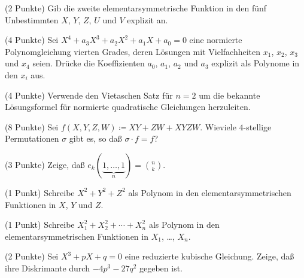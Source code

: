 \documentclass{algsheet}
\begin{document}
\begin{exercise}(2 Punkte)\newline
    Gib die zweite elementarsymmetrische Funktion in den fünf Unbestimmten
    \(X\), \(Y\), \(Z\), \(U\) und \(V\) explizit an.
\end{exercise}

\begin{exercise}(4 Punkte)\newline
    Sei \(X^4 + a_3 X^3 + a_2 X^2 + a_1 X + a_0 = 0\) eine normierte Polynomgleichung
    vierten Grades, deren Lösungen mit Vielfachheiten \(x_1\), \(x_2\), \(x_3\)
    und \(x_4\) seien. Drücke die Koeffizienten \(a_0\), \(a_1\), \(a_2\) und
    \(a_3\) explizit als Polynome in den \(x_i\) aus.
\end{exercise}

\begin{exercise}(4 Punkte)\newline
    Verwende den Vietaschen Satz für \(n = 2\) um die bekannte Lösungsformel
    für normierte quadratische Gleichungen herzuleiten.
\end{exercise}




\begin{exercise}(8 Punkte)\newline
    Sei \(f(X, Y, Z, W) \coloneqq X Y + Z W + X Y Z W\).
    Wieviele \(4\)-stellige Permutationen \(\sigma\) gibt es, so daß
    \(\sigma \cdot f = f\)?
\end{exercise}

\begin{exercise}(3 Punkte)\newline
     Zeige, daß \(e_k(\underbrace{1, \dots, 1}_n) = \binom n k\).
\end{exercise}
 
\begin{exercise}(1 Punkt)\newline
    Schreibe \(X^2 + Y^2 + Z^2\) als Polynom in den elementarsymmetrischen
    Funktionen in \(X\), \(Y\) und \(Z\).
\end{exercise}

\begin{exercise}(1 Punkt)\newline
    Schreibe \(X_1^2 + X_2^2 + \dotsb + X_n^2\) als Polynom in den
    elementarsymmetrischen Funktionen in \(X_1\), \dots, \(X_n\).
\end{exercise}

\begin{exercise}(2 Punkte)\newline
    Sei \(X^3 + p X + q = 0\) eine reduzierte kubische Gleichung. Zeige, daß
    ihre Diskrimante durch \(-4 p^3 - 27 q^2\) gegeben ist.
\end{exercise}
\end{document}
